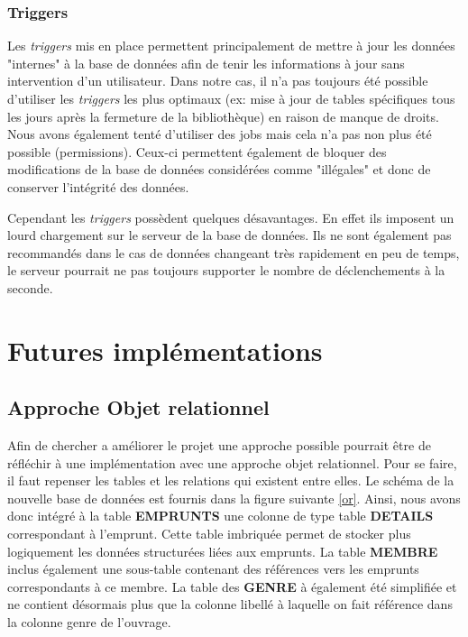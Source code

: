 \documentclass[11pt,a4paper]{article}
\begin{document}
\subsubsection{Triggers}
Les \textit{triggers} mis en place permettent principalement de mettre à jour les données "internes" à la base de données afin de tenir les informations à jour sans intervention d'un utilisateur.
Dans notre cas, il n'a pas toujours été possible d'utiliser les \textit{triggers} les plus optimaux (ex: mise à jour de tables spécifiques tous les jours après la fermeture de la bibliothèque) en raison de manque de droits.
Nous avons également tenté d'utiliser des jobs mais cela n'a pas non plus été possible (permissions).
Ceux-ci permettent également de bloquer des modifications de la base de données considérées comme "illégales" et donc de conserver l'intégrité des données.
\par
Cependant les \textit{triggers} possèdent quelques désavantages. En effet ils imposent un lourd chargement sur le serveur de la base de données. Ils ne sont également pas recommandés dans le cas de données changeant très rapidement en peu de temps, le serveur pourrait ne pas toujours supporter le nombre de déclenchements à la seconde.



\newpage

\section{Futures implémentations}
\subsection{Approche Objet relationnel}
Afin de chercher a améliorer le projet une approche possible pourrait être de réfléchir à une implémentation avec une approche objet relationnel. 
Pour se faire, il faut repenser les tables et les relations qui existent entre elles. Le schéma de la nouvelle base de données est fournis dans la figure suivante \ref{or}.
Ainsi, nous avons donc intégré à la table \textbf{EMPRUNTS} une colonne de type table \textbf{DETAILS} correspondant à l'emprunt. Cette table imbriquée permet de stocker plus logiquement les données structurées liées aux emprunts. 
La table \textbf{MEMBRE} inclus également une sous-table contenant des références vers les emprunts correspondants à ce membre. La table des \textbf{GENRE} à également été simplifiée et ne contient désormais plus que la colonne libellé à laquelle on fait référence dans la colonne genre de l'ouvrage.
\end{document}
